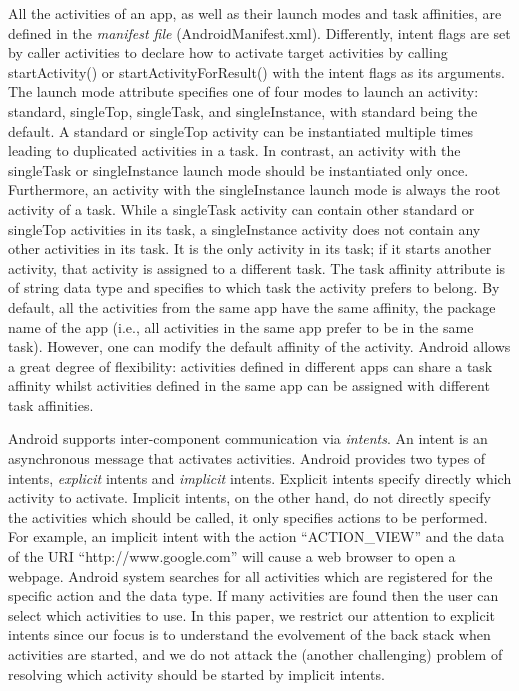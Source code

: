  All the activities of an app, as well as their launch modes and task affinities, are defined in the \emph{manifest file}  
 ({\sf AndroidManifest.xml}). Differently, intent flags are set by caller activities to declare how to activate target activities by calling startActivity() or startActivityForResult() with the intent flags as its arguments. The launch mode attribute  specifies one of four modes to launch an activity: standard, singleTop, singleTask, and singleInstance, with standard being the default. A standard or singleTop activity can be instantiated multiple times leading to duplicated activities in a task. In contrast, an activity with the singleTask or singleInstance launch mode should be instantiated only once. Furthermore, an activity with the singleInstance launch mode is always the root activity of a task. While a singleTask activity
 can contain other standard or singleTop activities in its task, a singleInstance activity does not contain any other
 activities in its task. It is the only activity in its task; if it starts another activity, that activity is assigned to a different task. 
The task affinity attribute is of string data type and specifies to which task the activity prefers to belong. By default, all the activities from the same app have the same affinity, the package name of the app (i.e., all activities in the same app prefer to be in the same task). However, one can modify the default affinity of the activity. Android allows a great degree of flexibility: activities defined in different apps can share a task affinity whilst activities defined in the same app can be assigned with different task affinities.  

 
Android supports inter-component communication via \emph{intents}. An intent is an asynchronous message that activates activities. 
Android provides two types of intents, \emph{explicit} intents and \emph{implicit} intents. 
Explicit intents specify directly which activity to activate. Implicit intents, on the other hand, do not directly specify the activities which should be called, it only specifies actions to be performed. 
For example, an implicit intent with the action ``ACTION\_VIEW'' and the data of the URI ``http://www.google.com'' will cause a web browser to open a webpage. 
Android system searches for all activities which are registered for the specific action and the data type. If many activities are found then the user can select which activities to use.
In this paper, we restrict our attention to explicit intents since our focus is to understand the evolvement of the back stack when activities are started, and we do not attack the (another challenging) problem of resolving which activity should be started by implicit intents. 


